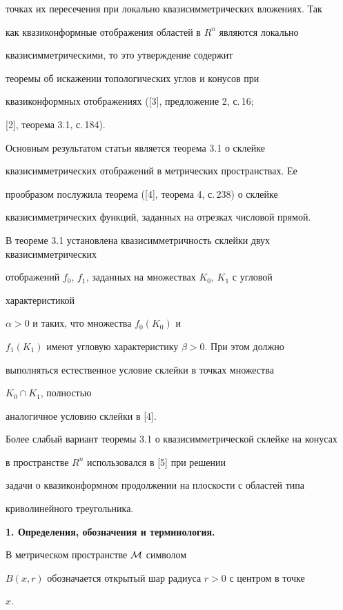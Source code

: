 точках их пересечения при локально квазисимметрических вложениях. Так 


как квазиконформные отображения областей в $R^n$ являются локально 


квазисимметрическими, то это утверждение содержит 


теоремы об искажении топологических углов и конусов при 


квазиконформных отображениях ([3], предложение 2, с.\,16; 


[2], теорема 3.1, с.\,184).


Основным результатом статьи является теорема 3.1 о склейке 


квазисимметрических отображений в метрических пространствах. Ее 


прообразом послужила теорема ([4], теорема 4, с.\,238) о склейке 


квазисимметрических функций, заданных на отрезках числовой прямой. 


В теореме 3.1 установлена квазисимметричность склейки двух квазисимметрических 


отображений $f_0$, $f_1$, заданных на множествах $K_0$, $K_1$ с угловой 


характеристикой 


$\alpha > 0$ и таких, что множества $f_0(K_0)$ и 


$f_1(K_1)$ имеют угловую характеристику $\beta > 0$. При этом должно 


выполняться естественное условие склейки в точках множества 


$K_0\cap K_1$, полностью 


аналогичное условию склейки в [4]. 


Более слабый вариант теоремы 3.1 о квазисимметрической склейке на конусах 


в пространстве $R^n$ использовался в [5] при решении 


задачи о квазиконформном продолжении на плоскости с областей типа 


криволинейного треугольника.


\medskip





{\bf 1. Определения, обозначения и терминология.} 


В метрическом пространстве ${\cal M}$ символом 


$B(x,r)$ обозначается открытый шар радиуса $r>0$ с центром в точке 


$x$.





